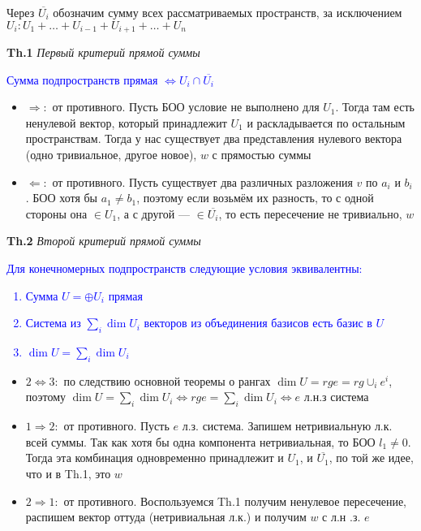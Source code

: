 Через $\overline{U_i}$ обозначим сумму всех рассматриваемых пространств, за исключением $U_i: U_1 + \dots + U_{i-1} +
U_{i+1} + \dots + U_n$

\textbf{Th.1} \textit{Первый критерий прямой суммы}

\textcolor{blue}{Сумма подпространств прямая $\Leftrightarrow U_i \cap \overline{U_i}$}

\begin{itemize}
    \item $\Rightarrow:$ от противного.
    Пусть БОО условие не выполнено для $U_1$.
    Тогда там есть ненулевой вектор, который принадлежит $U_1$ и раскладывается по остальным пространствам.
    Тогда у нас существует два представления нулевого вектора (одно тривиальное, другое новое), $w$ с прямостью суммы
    \item $\Leftarrow:$ от противного.
    Пусть существует два различных разложения $v$ по $a_i$ и $b_i$.
    БОО хотя бы $a_1 \neq b_1$, поэтому если возьмём их разность, то с одной стороны она $\in U_1$, а с другой ---
    $\in \overline{U_i}$, то есть пересечение не тривиально, $w$
\end{itemize}

\textbf{Th.2} \textit{Второй критерий прямой суммы}

\textcolor{blue}{Для конечномерных подпространств следующие условия эквивалентны:
    \begin{enumerate}
        \item Сумма $U = \oplus U_i$ прямая
        \item Система из $\sum_i \dim U_i$ векторов из объединения базисов есть базис в $U$
        \item $\dim U = \sum_i \dim U_i$
    \end{enumerate} }

\begin{itemize}
    \item $2 \Leftrightarrow 3:$ по следствию основной теоремы о рангах $\dim U = rg e = rg \cup_i e^i$, поэтому
    $ \dim U = \sum_i \dim U_i \Leftrightarrow rg e = \sum_i \dim U_i \Leftrightarrow e $ л.н.з система
    \item $1 \Rightarrow 2:$ от противного.
    Пусть $e$ л.з. система.
    Запишем нетривиальную л.к. всей суммы.
    Так как хотя бы одна компонента нетривиальная, то БОО $l_1 \neq 0$.
    Тогда эта комбинация одновременно принадлежит и $U_1$, и $\overline{U_1}$, по той же идее, что и в Th.1, это $w$
    \item $2 \Rightarrow 1:$ от противного.
    Воспользуемся Th.1 получим ненулевое пересечение, распишем вектор оттуда (нетривиальная л.к.) и получим $w$ с л.н
    .з. $e$
\end{itemize}

